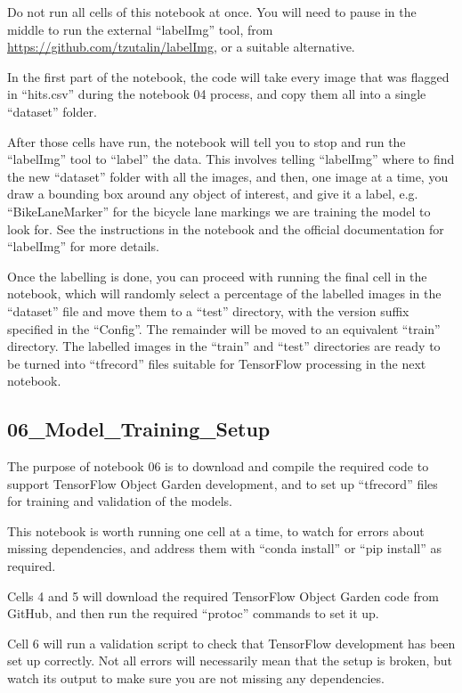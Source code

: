 \documentclass[11pt,twoside]{report}
\begin{document}
Do not run all cells of this notebook at once.  You will need to pause in the middle to run the external ``labelImg'' tool, from \url{https://github.com/tzutalin/labelImg}, or a suitable alternative.

In the first part of the notebook, the code will take every image that was flagged in ``hits.csv'' during the notebook 04 process, and copy them all into a single ``dataset'' folder.

After those cells have run, the notebook will tell you to stop and run the ``labelImg'' tool to ``label'' the data.  This involves telling ``labelImg'' where to find the new ``dataset'' folder with all the images, and then, one image at a time, you draw a bounding box around any object of interest, and give it a label, e.g. ``BikeLaneMarker'' for the bicycle lane markings we are training the model to look for.  See the instructions in the notebook and the official documentation for ``labelImg'' for more details.

Once the labelling is done, you can proceed with running the final cell in the notebook, which will randomly select a percentage of the labelled images in the ``dataset'' file and move them to a ``test'' directory, with the version suffix specified in the ``Config''.  The remainder will be moved to an equivalent ``train'' directory.  The labelled images in the ``train'' and ``test'' directories are ready to be turned into ``tfrecord'' files suitable for TensorFlow processing in the next notebook.


\subsection{06\_Model\_Training\_Setup}
\label{aj06}

The purpose of notebook 06 is to download and compile the required code to support TensorFlow Object Garden development, and to set up ``tfrecord'' files for training and validation of the models.

This notebook is worth running one cell at a time, to watch for errors about missing dependencies, and address them with ``conda install'' or ``pip install'' as required.

Cells 4 and 5 will download the required TensorFlow Object Garden code from GitHub, and then run the required ``protoc'' commands to set it up.

Cell 6 will run a validation script to check that TensorFlow development has been set up correctly.  Not all errors will necessarily mean that the setup is broken, but watch its output to make sure you are not missing any dependencies.
\end{document}

